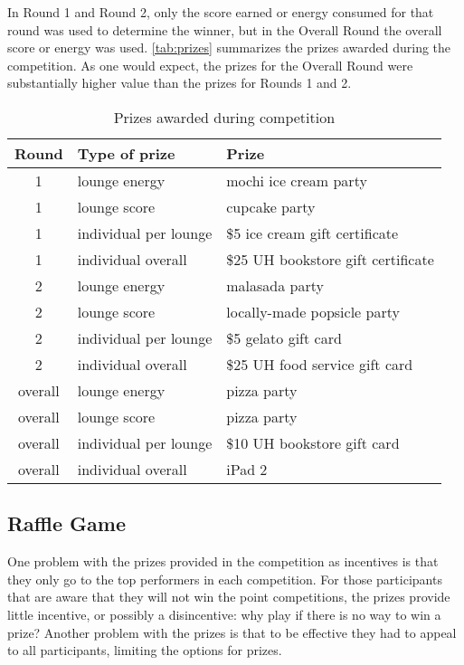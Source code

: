 In Round 1 and Round 2, only the score earned or energy consumed for that round was used to determine the winner, but in the Overall Round the overall score or energy was used. \autoref{tab:prizes} summarizes the prizes awarded during the competition. As one would expect, the prizes for the Overall Round were substantially higher value than the prizes for Rounds 1 and 2.

\begin{table}[htbp]
	\centering
		\begin{tabular}{| c | l | l |}
			\hline
			Round & Type of prize & Prize \tabularnewline \hline \hline
			1 & lounge energy & mochi ice cream party \\ \hline
			1 & lounge score & cupcake party \\ \hline
			1 & individual per lounge & \$5 ice cream gift certificate \\ \hline
			1 & individual overall & \$25 UH bookstore gift certificate \\ \hline
			2 & lounge energy & malasada party \\ \hline
			2 & lounge score & locally-made popsicle party \\ \hline
			2 & individual per lounge & \$5 gelato gift card \\ \hline
			2 & individual overall & \$25 UH food service gift card \\ \hline
			overall & lounge energy & pizza party \\ \hline
			overall & lounge score & pizza party \\ \hline
			overall & individual per lounge & \$10 UH bookstore gift card \\ \hline
			overall & individual overall & iPad 2 \\ \hline
		\end{tabular}
	\caption{Prizes awarded during competition}
\label{tab:prizes}
\end{table}


\subsection{Raffle Game}
\label{sec:raffle-game}

One problem with the prizes provided in the competition as incentives is that they only go to the top performers in each competition. For those participants that are aware that they will not win the point competitions, the prizes provide little incentive, or possibly a disincentive: why play if there is no way to win a prize? Another problem with the prizes is that to be effective they had to appeal to all participants, limiting the options for prizes.

